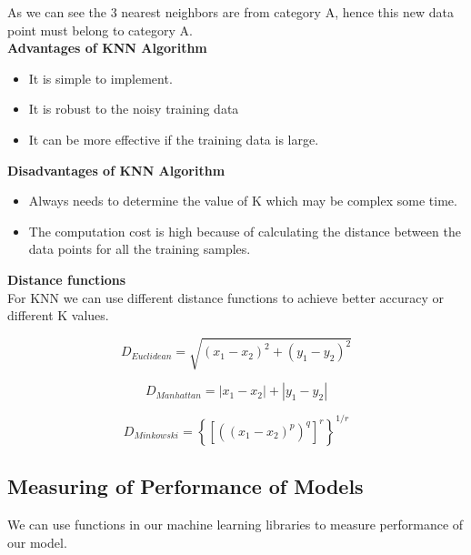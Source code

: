 As we can see the 3 nearest neighbors are from category A, hence this new data point must belong to category A. \\

\textbf{Advantages of KNN Algorithm} \\
\begin{itemize}
\item It is simple to implement.
\item It is robust to the noisy training data
\item It can be more effective if the training data is large.
\end{itemize}

\textbf{Disadvantages of KNN Algorithm} \\
\begin{itemize}
\item Always needs to determine the value of K which may be complex some time.
\item The computation cost is high because of calculating the distance between the data points for all the training samples.
\end{itemize}

\textbf{Distance functions} \\ 

For KNN we can use different distance functions to achieve better accuracy or different K values.

\begin{equation}
    {D_{Euclidean}} = \sqrt{(x_1-x_2)^2 + (y_1-y_2)^2}
\end{equation}

\begin{equation}
    {D_{Manhattan}} = |x_1-x_2| + |y_1-y_2|
\end{equation}

\begin{equation}
    {D_{Minkowski}} = \left\{ \left[ \left( \left( x_1-x_2 \right)^p \right)^q \right]^r \right\}^{1/r}
\end{equation}

\subsection{Measuring of Performance of Models}

We can use functions in our machine learning libraries to measure performance of our model.

